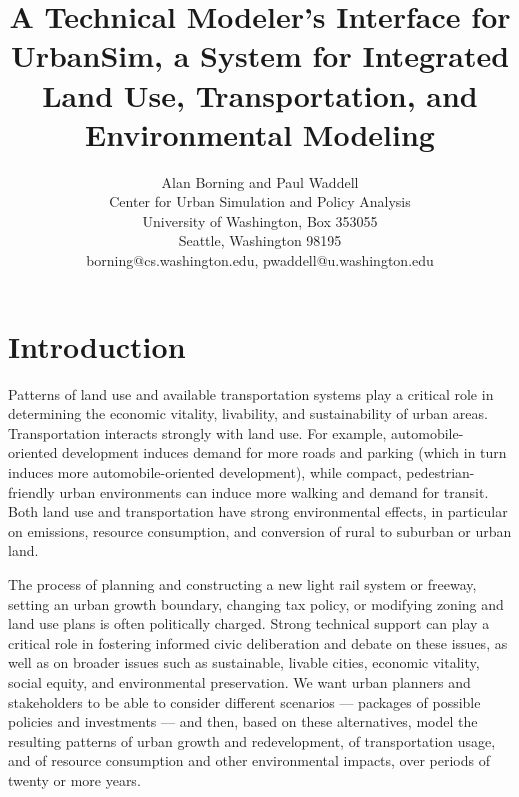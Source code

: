 \documentclass[11pt]{article}
\begin{document}
\title{A Technical Modeler's Interface for UrbanSim, a System for
Integrated Land Use, Transportation, and Environmental Modeling}

\author{Alan Borning and Paul Waddell\\
Center for Urban Simulation and Policy Analysis \\
University of Washington, Box 353055 \\
Seattle, Washington 98195 \\
borning@cs.washington.edu, pwaddell@u.washington.edu}

\date{}

\maketitle

\section{Introduction}
\label{introduction}

Patterns of land use and available transportation systems play a critical
role in determining the economic vitality, livability, and sustainability
of urban areas.  Transportation interacts strongly with land use.  For
example, automobile-oriented development induces demand for more roads and
parking (which in turn induces more automobile-oriented development), while
compact, pedestrian-friendly urban environments can induce more walking and
demand for transit.  Both land use and transportation have strong
environmental effects, in particular on emissions, resource consumption,
and conversion of rural to suburban or urban land.

The process of planning and constructing a new light rail system or freeway,
setting an urban growth boundary, changing tax policy, or modifying zoning
and land use plans is often politically charged.  Strong technical support
can play a critical role in fostering informed civic deliberation and
debate on these issues, as well as on broader issues such as sustainable,
livable cities, economic vitality, social equity, and environmental
preservation.  We want urban planners and stakeholders to be able to
consider different scenarios --- packages of possible policies and
investments --- and then, based on these alternatives, model the resulting
patterns of urban growth and redevelopment, of transportation usage, and of
resource consumption and other environmental impacts, over periods of
twenty or more years.
\end{document}
